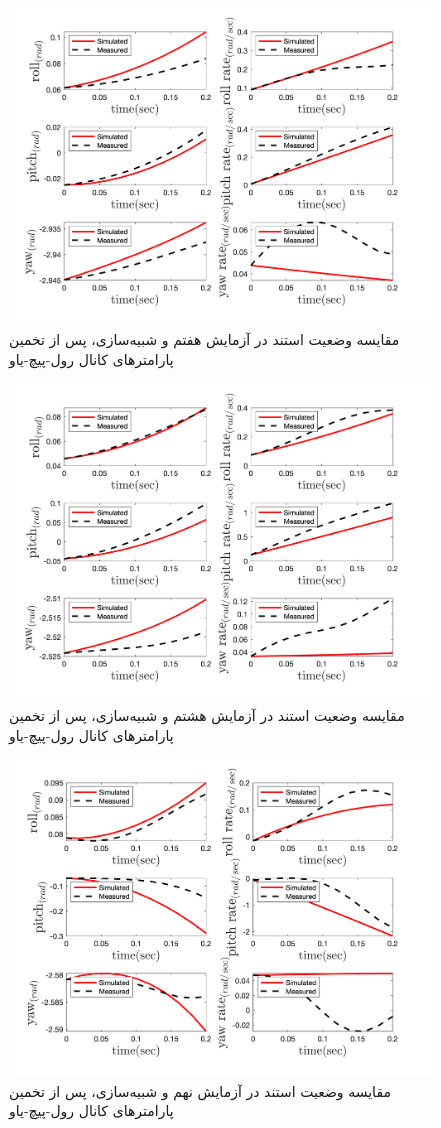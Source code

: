 \begin{figure}[H]
	\includegraphics[width=12cm]{../Figures/RCP/roll_pitch_yaw_parameter_estimation/RCP_roll_pitch_yaw_S8.png}
	\centering
	\caption{مقايسه وضعیت استند در  آزمايش هفتم و شبیه‌سازی، پس از تخمین پارامترهای کانال رول-پیچ-یاو}
	\label{ roll_pitch_yaw_ps7}
\end{figure}
\begin{figure}[H]
	\includegraphics[width=12cm]{../Figures/RCP/roll_pitch_yaw_parameter_estimation/RCP_roll_pitch_yaw_S9.png}
	\centering
	\caption{مقايسه وضعیت استند در  آزمايش هشتم و شبیه‌سازی، پس از تخمین پارامترهای کانال رول-پیچ-یاو}
	\label{ roll_pitch_yaw_ps8}
\end{figure}
\begin{figure}[H]
	\includegraphics[width=12cm]{../Figures/RCP/roll_pitch_yaw_parameter_estimation/RCP_roll_pitch_yaw_S10.png}
	\centering
	\caption{مقايسه وضعیت استند در  آزمايش نهم و شبیه‌سازی، پس از تخمین پارامترهای کانال رول-پیچ-یاو}
	\label{ roll_pitch_yaw_ps9}
\end{figure}
